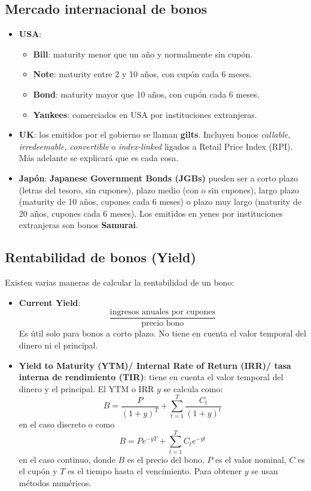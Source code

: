 \subsection{Mercado internacional de bonos}
\begin{itemize}
    \item \textbf{USA}: 
    \begin{itemize}
        \item \textbf{Bill}: maturity menor que un año y normalmente sin cupón.
        \item \textbf{Note}: maturity entre 2 y 10 años, con cupón cada 6 meses.
        \item \textbf{Bond}: maturity mayor que 10 años, con cupón cada 6 meses.
        \item \textbf{Yankees}: comerciados en USA por instituciones extranjeras.
    \end{itemize}
    \item \textbf{UK}: los emitidos por el gobierno se llaman \textbf{gilts}. Incluyen bonos \textit{callable, irredeemable, convertible} o \textit{index-linked} ligados a Retail Price Index (RPI). Más adelante se explicará que es cada cosa.
    \item \textbf{Japón}: \textbf{Japanese Government Bonds (JGBs)} pueden ser a corto plazo (letras del tesoro, sin cupones), plazo medio (con o sin cupones), largo plazo (maturity de 10 años, cupones cada 6 meses) o plazo muy largo (maturity de 20 años, cupones cada 6 meses). Los emitidos en yenes por instituciones extranjeras son bonos \textbf{Samurai}.
\end{itemize}







\subsection{Rentabilidad de bonos (Yield)}
Existen varias maneras de calcular la rentabilidad de un bono:
\begin{itemize}
    \item \textbf{Current Yield}:
    \[
        \frac{\text{ingresos anuales por cupones}}{\text{precio bono}}
    \]
    Es útil solo para bonos a corto plazo. No tiene en cuenta el valor temporal del dinero ni el principal.
    \item \textbf{Yield to Maturity (YTM)/ Internal Rate of Return (IRR)/ tasa interna de rendimiento (TIR)}: tiene en cuenta el valor temporal del dinero y el principal. El YTM o IRR $y$ se calcula como:
    \[
        \boxed{ B = \frac{P}{(1+y)^T} + \sum_{t=1}^{T} \frac{C_t}{(1+y)^t} }
    \]
    en el caso discreto o como
    \[
        \boxed{ B = P e^{-yT} + \sum_{t=1}^{T} C_t e^{-yt}}
    \]
    en el caso continuo, donde $B$ es el precio del bono, $P$ es el valor nominal, $C$ es el cupón y $T$ es el tiempo hasta el vencimiento. Para obtener $y$ se usan métodos numéricos.
\end{itemize}




